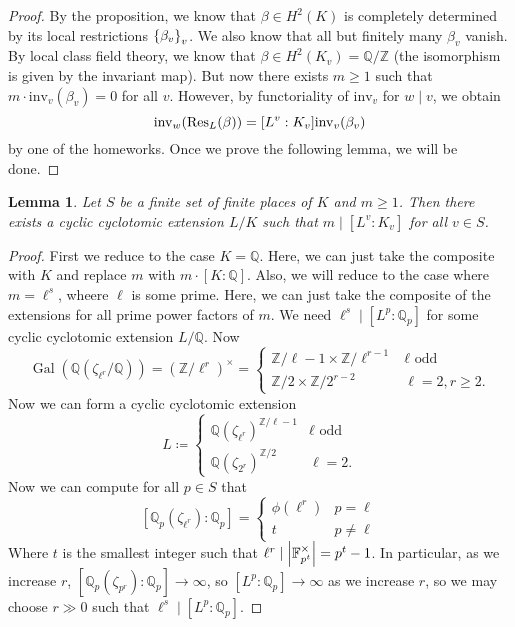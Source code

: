 \documentclass[leqno, openany]{memoir}
\newtheorem{lem}[thm]{Lemma}
\theoremstyle{definition}
\theoremstyle{remark}
\theoremstyle{plain}
\theoremstyle{definition}
\theoremstyle{remark}
\newcommand{\F}{\mathbb{F}}
\newcommand{\Z}{\mathbb{Z}}
\newcommand{\Q}{\mathbb{Q}}
\newcommand{\mr}[1]{\mathrm{#1}}
\DeclareMathOperator{\Gal}{Gal}
\begin{document}
\begin{proof}
    By the proposition, we know that $\beta \in H^2(K)$ is completely determined by its local restrictions $\qty{\beta_v}_v$. We also know that all but finitely many $\beta_v$ vanish. By local class field theory, we know that $\beta \in H^2(K_v) = \Q/\Z$ (the isomorphism is given by the invariant map). But now there exists $m \geq 1$ such that $m \cdot \mr{inv}_v(\beta_v) = 0$ for all $v$. However, by functoriality of $\mr{inv}_v$ for $w \mid v$, we obtain
    \[ \mr{inv}_w (\Res_L(\beta)) = [L^v:K_v] \mr{inv}_v(\beta_v) \]
    by one of the homeworks. Once we prove the following lemma, we will be done.
\end{proof}

\begin{lem}
    Let $S$ be a finite set of finite places of $K$ and $m \geq 1$. Then there exists a cyclic cyclotomic extension $L/K$ such that $m \mid [L^v:K_v]$ for all $v \in S$.
\end{lem}

\begin{proof}
    First we reduce to the case $K = \Q$. Here, we can just take the composite with $K$ and replace $m$ with $m \cdot [K:\Q]$. Also, we will reduce to the case where $m = \ell^s$, wheere $\ell$ is some prime. Here, we can just take the composite of the extensions for all prime power factors of $m$. We need $\ell^s \mid [L^p : \Q_p]$ for some cyclic cyclotomic extension $L/\Q$. Now 
    \[ \Gal(\Q(\zeta_{\ell^r}/\Q)) = {(\Z/\ell^r)}^{\times} = \begin{cases}
        \Z/\ell-1 \times \Z/\ell^{r-1} & \ell \text{ odd } \\
        \Z/2 \times \Z/2^{r-2} & \ell = 2, r \geq 2.
    \end{cases} \]
    Now we can form a cyclic cyclotomic extension
    \[ L \coloneqq \begin{cases}
        {\Q(\zeta_{\ell^r})}^{\Z/\ell-1} & \ell \text{ odd } \\
        {\Q(\zeta_{2^r})}^{\Z/2} & \ell = 2.
    \end{cases} \]
    Now we can compute for all $p \in S$ that
    \[ [\Q_p(\zeta_{\ell^r}) : \Q_p] = \begin{cases}
        \phi(\ell^r) & p=\ell \\
        t & p \neq \ell
    \end{cases} \]
    Where $t$ is the smallest integer such that $\ell^r \mid \abs{\F_{p^t}^{\times}} = p^t-1$. In particular, as we increase $r$, $[\Q_p(\zeta_{p^r}):\Q_p] \to \infty$, so $[L^p \colon \Q_p] \to \infty$ as we increase $r$, so we may choose $r \gg 0$ such that $\ell^s \mid [L^p:\Q_p]$.
\end{proof}
\end{document}
